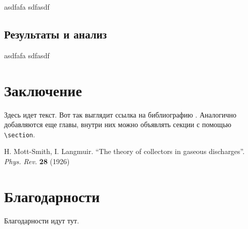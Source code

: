 \documentclass{mipt-thesis-ms}
\begin{document}
asdfafa sdfasdf

\section{Результаты и анализ}

asdfafa sdfasdf


\chapter{Заключение}

Здесь идет текст. Вот так выглядит ссылка на библиографию \cite{langmuir26}. Аналогично добавляются еще главы, внутри них можно объявлять секции с помощью \verb|\section|.


\backmatter

\begin{thebibliography}{99}
        H. Mott-Smith, I. Langmuir. ``The theory of collectors in gaseous discharges''. \emph{Phys. Rev.} \textbf{28} (1926)
\end{thebibliography}

\chapter{Благодарности}

Благодарности идут тут.
\end{document}
